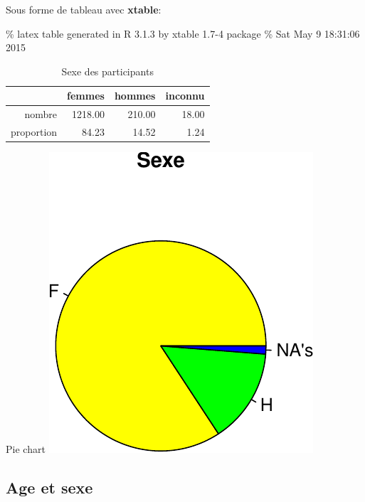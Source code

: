 \documentclass[]{article}
\begin{document}
Sous forme de tableau avec \textbf{xtable}:

\% latex table generated in R 3.1.3 by xtable 1.7-4 package \% Sat May 9
18:31:06 2015

\begin{table}[ht]
\centering
\begin{tabular}{rrrr}
  \hline
 & femmes & hommes & inconnu \\ 
  \hline
nombre & 1218.00 & 210.00 & 18.00 \\ 
  proportion & 84.23 & 14.52 & 1.24 \\ 
   \hline
\end{tabular}
\caption{Sexe des participants} 
\label{sexe}
\end{table}

Pie chart
\includegraphics{qs_etudiants_files/figure-latex/pie_sexe-1.pdf}

\subsection{Age et sexe}\label{age-et-sexe}
\end{document}
